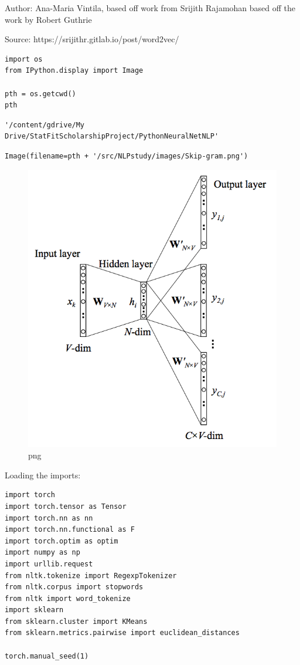 \documentclass[
]{article}
\author{}
\date{}
\begin{document}
Author: Ana-Maria Vintila, based off work from Srijith Rajamohan based
off the work by Robert Guthrie

Source: https://srijithr.gitlab.io/post/word2vec/

\begin{verbatim}
import os
from IPython.display import Image

pth = os.getcwd()
pth
\end{verbatim}

\begin{verbatim}
'/content/gdrive/My Drive/StatFitScholarshipProject/PythonNeuralNetNLP'
\end{verbatim}

\begin{verbatim}
Image(filename=pth + '/src/NLPstudy/images/Skip-gram.png')
\end{verbatim}

\begin{figure}
\centering
\includegraphics{SkipGram_Rajamohan_files/SkipGram_Rajamohan_3_0.png}
\caption{png}
\end{figure}

Loading the imports:

\begin{verbatim}
import torch
import torch.tensor as Tensor
import torch.nn as nn
import torch.nn.functional as F
import torch.optim as optim
import numpy as np
import urllib.request
from nltk.tokenize import RegexpTokenizer
from nltk.corpus import stopwords
from nltk import word_tokenize
import sklearn
from sklearn.cluster import KMeans
from sklearn.metrics.pairwise import euclidean_distances

torch.manual_seed(1)
\end{verbatim}
\end{document}
